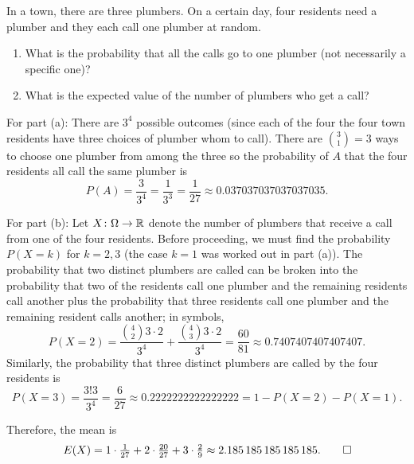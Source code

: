\begin{problem}[Handout 3, \# 5]
  In a town, there are three plumbers. On a certain day, four residents
  need a plumber and they each call one plumber at random.
  \begin{enumerate}[label=(\alph*),noitemsep]
  \item What is the probability that all the calls go to one plumber (not
    necessarily a specific one)?
  \item What is the expected value of the number of plumbers who get a
    call?
  \end{enumerate}
\end{problem}
\begin{solution*}
  For part (a): There are \(3^4\) possible outcomes (since each of the four
  the four town residents have three choices of plumber whom to
  call). There are \(\binom{3}{1}=3\) ways to choose one plumber from among
  the three so the probability of \(A\) that the four residents all call
  the same plumber is
  \[
    P(A)=\frac{3}{3^4}=%
    \frac{1}{3^3}=%
    \frac{1}{27}\approx%
    \num{0.037037037037037035}.
  \]

  For part (b): Let \(X\colon\Omega\to\mathbb{R}\) denote the number of plumbers
  that receive a call from one of the four residents. Before proceeding, we
  must find the probability \(P(X=k)\) for \(k=2,3\) (the case \(k=1\) was
  worked out in part (a)). The probability that two distinct plumbers are
  called can be broken into the probability that two of the residents call
  one plumber and the remaining residents call another plus the probability
  that three residents call one plumber and the remaining resident calls
  another; in symbols,
  \[
    P(X=2)=%
    \frac{\binom{4}{2}3\cdot 2}{3^4}+\frac{\binom{4}{3}3\cdot 2}{3^4}=%
    \frac{60}{81}\approx\num{0.7407407407407407}.
  \]
  Similarly, the probability that three distinct plumbers are called by the
  four residents is
  \[
    P(X=3)=%
    \frac{3!3}{3^4}=\frac{6}{27}\approx%
    \num{0.2222222222222222}=%
    1-P(X=2)-P(X=1).
  \]

  Therefore, the mean is
  \[
    E(X)
    =1\cdot\tfrac{1}{27}+2\cdot\tfrac{20}{27}+3\cdot\tfrac{2}{9}
    \approx\num{2.185185185185185}.\qedhere
  \]
\end{solution*}


